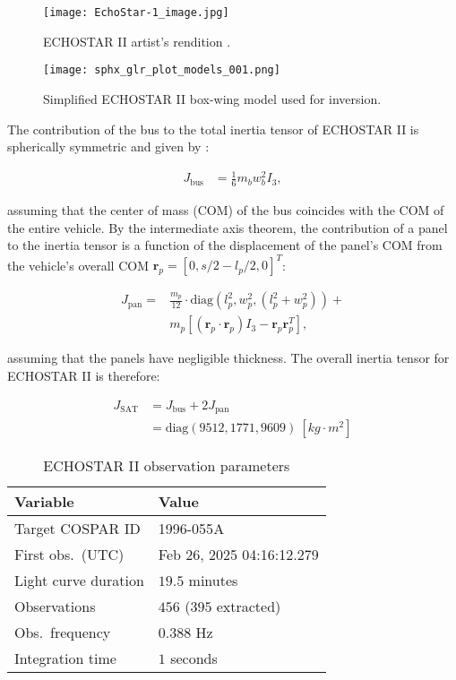 \documentclass[a4paper,twocolumn]{spaceDebrisC} %
\newcommand{\vctr}[1]{\bm{#1}}
\newcommand{\figbig}[0]{0.5\textwidth}
\begin{document}
\begin{figure}[H]
  \centering
  \texttt{[image: EchoStar-1\_image.jpg]}
  \caption{ECHOSTAR II artist's rendition \cite{as7000_astronautix}.}
  \label{fig:echostar1}
\end{figure}

\begin{figure}[H]
  \centering
  \texttt{[image: sphx\_glr\_plot\_models\_001.png]}
  \caption{Simplified ECHOSTAR II box-wing model used for inversion.}
  \label{fig:echostar1_simple}
\end{figure}

The contribution of the bus to the total inertia tensor of ECHOSTAR II is spherically symmetric and given by \cite{satterly1958}:

\begin{align}
 J_\text{bus} &= \frac{1}{6} m_b w_b^2 I_3,
\end{align}

\noindent
assuming that the center of mass (COM) of the bus coincides with the COM of the entire vehicle. By the intermediate axis theorem, the contribution of a panel to the inertia tensor is a function of the displacement of the panel's COM from the vehicle's overall COM $\vctr{r}_p = [ 0, s/2 - l_p/2, 0]^T$:

\begin{equation}
  \begin{split}
 J_\text{pan} = &\frac{m_p}{12} \cdot \text{diag}\left(l_p^2, w_p^2, \left(l_p^2 + w_p^2\right) \right) + \\&m_p \left[ \left( \vctr{r}_p \cdot \vctr{r}_p \right) I_3 - \vctr{r}_p \vctr{r}_p^T \right],
  \end{split}
\end{equation}

\noindent
assuming that the panels have negligible thickness. The overall inertia tensor for ECHOSTAR II is therefore:

\begin{align}
 J_\text{SAT} &= J_\text{bus} + 2J_\text{pan} \\
  &= \text{diag} \left( 9512, 1771, 9609 \right) \: [kg \cdot m^2]
\end{align}


\begin{table}[H]
  \centering
  \caption{ECHOSTAR II observation parameters}
  \vspace*{6pt}
  \begin{tabular}{|l|l|}
  \hline
  \textbf{Variable} & \textbf{Value} \\ \hline
  Target COSPAR ID & 1996-055A \\ \hline
  First obs.\ (UTC) & Feb 26, 2025 04:16:12.279 \\ \hline
  Light curve duration & $19.5$ minutes \\ \hline
  Observations & $456$ ($395$ extracted) \\ \hline
  Obs.\ frequency & $0.388$ Hz \\ \hline
  Integration time & $1$ seconds \\ \hline
  \end{tabular}
  \label{tb:case2_in}
\end{table}
\end{document}
